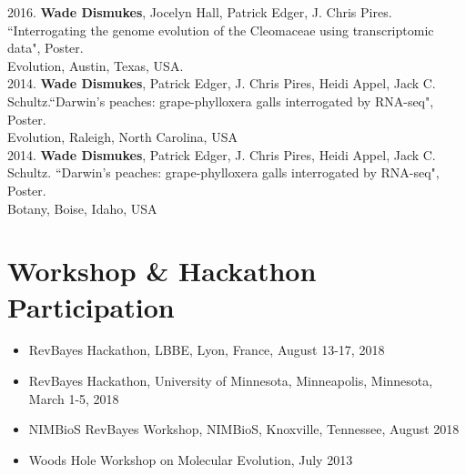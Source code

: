 \documentclass[12pt]{article}
\begin{document}
2016. \textbf{Wade Dismukes}, Jocelyn Hall, Patrick Edger, J. Chris Pires. ``Interrogating the genome evolution of the Cleomaceae using transcriptomic data", Poster. \\
Evolution, Austin, Texas, USA. \\

2014. \textbf{Wade Dismukes}, Patrick Edger, J. Chris Pires, Heidi Appel, Jack C. Schultz.``Darwin's peaches: grape-phylloxera galls interrogated by RNA-seq", Poster. \\
Evolution, Raleigh, North Carolina, USA  \\

2014. \textbf{Wade Dismukes}, Patrick Edger, J. Chris Pires, Heidi Appel, Jack C. Schultz. ``Darwin's peaches: grape-phylloxera galls interrogated by RNA-seq", Poster. \\
Botany, Boise, Idaho, USA \\


\section{Workshop \& Hackathon Participation}
\begin{itemize}
    \item RevBayes Hackathon, LBBE, Lyon, France, August 13-17, 2018
    \item RevBayes Hackathon, University of Minnesota, Minneapolis, Minnesota, March 1-5, 2018
    \item NIMBioS RevBayes Workshop, NIMBioS, Knoxville, Tennessee, August 2018
    \item Woods Hole Workshop on Molecular Evolution, July 2013
\end{itemize}
\end{document}
